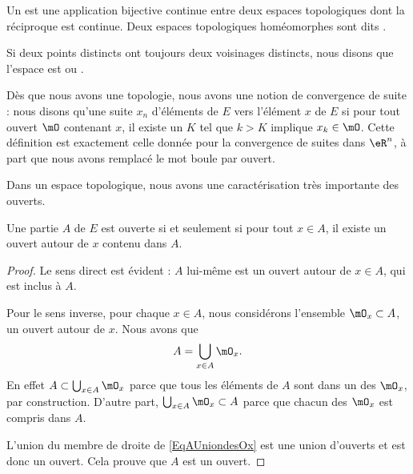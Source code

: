 \begin{definition}
    Un  est une application bijective continue entre deux espaces topologiques dont la réciproque est continue. Deux espaces topologiques homéomorphes sont dits .
\end{definition}

\begin{definition}
    Si deux points distincts ont toujours deux voisinages distincts, nous disons que l'espace est  ou .
\end{definition}

Dès que nous avons une topologie, nous avons une notion de convergence de suite : nous disons qu'une suite $x_n$ d'éléments de $E$  vers l'élément $x$ de $E$ si pour tout ouvert $\mO$ contenant $x$, il existe un $K$ tel que $k>K$ implique $x_k\in\mO$. Cette définition est exactement celle donnée pour la convergence de suites dans $\eR^n$, à part que nous avons remplacé le mot \og boule\fg{} par \og ouvert\fg.

Dans un espace topologique, nous avons une caractérisation très importante des ouverts.
\begin{theorem}		\label{ThoPartieOUvpartouv}
Une partie $A$ de $E$ est ouverte si et seulement si pour tout $x\in A$, il existe un ouvert autour de $x$ contenu dans $A$.
\end{theorem}

\begin{proof}
Le sens direct est évident : $A$ lui-même est un ouvert autour de $x\in A$, qui est inclus à $A$.

Pour le sens inverse, pour chaque $x\in A$, nous considérons l'ensemble $\mO_x\subset A$, un ouvert autour de $x$. Nous avons que
\begin{equation}	\label{EqAUniondesOx}
	A=\bigcup_{x\in A}\mO_x.
\end{equation}
En effet $A\subset\bigcup_{x\in A}\mO_x$ parce que tous les éléments de $A$ sont dans un des $\mO_x$, par construction. D'autre part, $\bigcup_{x\in A}\mO_x\subset A$ parce que chacun des $\mO_x$ est compris dans $A$.

L'union du membre de droite de \eqref{EqAUniondesOx} est une union d'ouverts et est donc un ouvert. Cela prouve que $A$ est un ouvert.

\end{proof}

